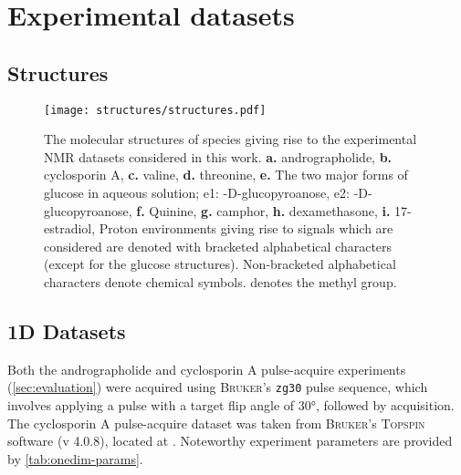 

\section{Experimental datasets}

\subsection{Structures}

\begin{figure}[H]
    \centering
    \texttt{[image: structures/structures.pdf]}
    \caption[
        The molecular structures of species giving rise to the experimental
        \acs{NMR} datasets considered in this work.
    ]{
        The molecular structures of species giving rise to the experimental
        \acs{NMR} datasets considered in this work.
        \textbf{a.} andrographolide,
        \textbf{b.} cyclosporin A,
        \textbf{c.} valine,
        \textbf{d.} threonine,
        \textbf{e.} The two major forms of glucose in aqueous solution;
            e1: \textalpha-D-glucopyroanose,
            e2: \textbeta-D-glucopyroanose,
        \textbf{f.} Quinine,
        \textbf{g.} camphor,
        \textbf{h.} dexamethasone,
        \textbf{i.} 17\textbeta-estradiol,
        Proton environments giving rise to signals which are considered are
        denoted with bracketed alphabetical characters (except for the glucose
        structures). Non-bracketed alphabetical characters denote chemical
        symbols.  denotes the methyl group.
    }
    \label{fig:structures}
\end{figure}

\subsection{\acs{1D} Datasets}

Both the andrographolide and cyclosporin A pulse-acquire experiments
(\cref{sec:evaluation}) were acquired using \textsc{Bruker}'s \texttt{zg30}
pulse sequence, which involves applying a pulse with a target flip angle of
\ang{30}, followed by acquisition.  The cyclosporin A pulse-acquire dataset was
taken from \textsc{Bruker}'s \textsc{Topspin} software (v 4.0.8), located at
.  Noteworthy experiment
parameters are provided by \cref{tab:onedim-params}.

